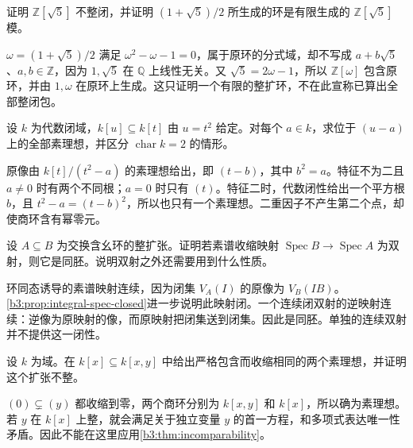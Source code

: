 \begin{exercise}\label{b3:ex:05-quadratic-order}
	证明 \(\mathbb Z[\sqrt5]\) 不整闭，并证明 \((1+\sqrt5)/2\) 所生成的环是有限生成的 \(\mathbb Z[\sqrt5]\) 模。
\end{exercise}
\begin{solution}
	\(\omega=(1+\sqrt5)/2\) 满足 \(\omega^2-\omega-1=0\)，属于原环的分式域，却不写成 \(a+b\sqrt5\)、\(a,b\in\mathbb Z\)，因为 \(1,\sqrt5\) 在 \(\mathbb Q\) 上线性无关。又 \(\sqrt5=2\omega-1\)，所以 \(\mathbb Z[\omega]\) 包含原环，并由 \(1,\omega\) 在原环上生成。这只证明一个有限的整扩环，不在此宣称已算出全部整闭包。
\end{solution}

\begin{exercise}\label{b3:ex:05-primes-square-map}
	设 \(k\) 为代数闭域，\(k[u]\subseteq k[t]\) 由 \(u=t^2\) 给定。对每个 \(a\in k\)，求位于 \((u-a)\) 上的全部素理想，并区分 \(\operatorname{char}k=2\) 的情形。
\end{exercise}
\begin{solution}
	原像由 \(k[t]/(t^2-a)\) 的素理想给出，即 \((t-b)\)，其中 \(b^2=a\)。特征不为二且 \(a\ne0\) 时有两个不同根；\(a=0\) 时只有 \((t)\)。特征二时，代数闭性给出一个平方根 \(b\)，且 \(t^2-a=(t-b)^2\)，所以也只有一个素理想。二重因子不产生第二个点，却使商环含有幂零元。
\end{solution}

\begin{exercise}\label{b3:ex:05-integral-homeomorphism}
	设 \(A\subseteq B\) 为交换含幺环的整扩张。证明若素谱收缩映射 \(\operatorname{Spec}B\to\operatorname{Spec}A\) 为双射，则它是同胚。说明双射之外还需要用到什么性质。
\end{exercise}
\begin{solution}
	环同态诱导的素谱映射连续，因为闭集 \(V_A(I)\) 的原像为 \(V_B(IB)\)。\cref{b3:prop:integral-spec-closed}进一步说明此映射闭。一个连续闭双射的逆映射连续：逆像为原映射的像，而原映射把闭集送到闭集。因此是同胚。单独的连续双射并不提供这一闭性。
\end{solution}

\begin{exercise}\label{b3:ex:05-nonintegral-incomparability}
	设 \(k\) 为域。在 \(k[x]\subseteq k[x,y]\) 中给出严格包含而收缩相同的两个素理想，并证明这个扩张不整。
\end{exercise}
\begin{solution}
	\((0)\subsetneq(y)\) 都收缩到零，两个商环分别为 \(k[x,y]\) 和 \(k[x]\)，所以确为素理想。若 \(y\) 在 \(k[x]\) 上整，就会满足关于独立变量 \(y\) 的首一方程，和多项式表达唯一性矛盾。因此不能在这里应用\cref{b3:thm:incomparability}。
\end{solution}


